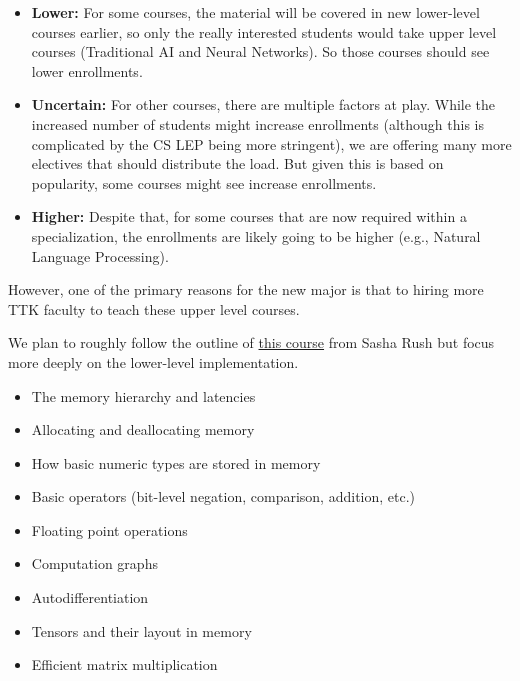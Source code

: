 \begin{itemize}
    \item \textbf{Lower:} For some courses, the material will be covered in new lower-level courses earlier, so only the really interested students would take upper level \ai{} courses (Traditional AI and Neural Networks).  So those courses should see lower enrollments.
    \item \textbf{Uncertain:} For other courses, there are multiple factors at play.  While the increased number of students might increase enrollments (although this is complicated by the CS LEP being more stringent), we are offering many more electives that should distribute the load.  But given this is based on popularity, some courses might see increase enrollments.
    \item \textbf{Higher:} Despite that, for some courses that are now required within a specialization, the enrollments are likely going to be higher (e.g., Natural Language Processing).
\end{itemize}

However, one of the primary reasons for the new major is that to hiring more TTK faculty to teach these upper level courses.



We plan to roughly follow the outline of \href{https://minitorch.github.io/}{this course} from Sasha Rush but focus more deeply on the lower-level implementation.

\begin{itemize}
    \item The memory hierarchy and latencies 
    \item Allocating and deallocating memory
    \item How basic numeric types are stored in memory
    \item Basic operators (bit-level negation, comparison, addition, etc.)
    \item Floating point operations
    \item Computation graphs
    \item Autodifferentiation
    \item Tensors and their layout in memory
    \item Efficient matrix multiplication
\end{itemize}


